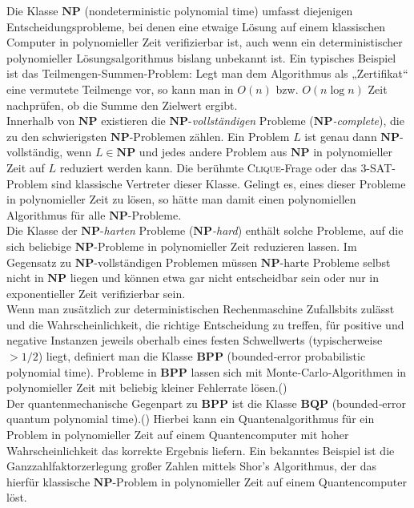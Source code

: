 {Die Klasse \(\mathbf{NP}\) (nondeterministic polynomial time) umfasst diejenigen Entscheidungsprobleme, bei denen eine etwaige Lösung auf einem klassischen Computer in polynomieller Zeit verifizierbar ist, auch wenn ein deterministischer polynomieller Lösungsalgorithmus bislang unbekannt ist. Ein typisches Beispiel ist das Teilmengen-Summen-Problem: Legt man dem Algorithmus als „Zertifikat“ eine vermutete Teilmenge vor, so kann man in \(O(n)\) bzw. \(O(n\log n)\) Zeit nachprüfen, ob die Summe den Zielwert ergibt.\\

Innerhalb von \(\mathbf{NP}\) existieren die \(\mathbf{NP}\)-\emph{vollständigen} Probleme (\(\mathbf{NP}\)\emph{-complete}), die zu den schwierigsten \(\mathbf{NP}\)-Problemen zählen. Ein Problem \(L\) ist genau dann \(\mathbf{NP}\)-vollständig, wenn \(L\in\mathbf{NP}\) und jedes andere Problem aus \(\mathbf{NP}\) in polynomieller Zeit auf \(L\) reduziert werden kann. Die berühmte \textsc{Clique}-Frage oder das \textsc{3-SAT}-Problem sind klassische Vertreter dieser Klasse. Gelingt es, eines dieser Probleme in polynomieller Zeit zu lösen, so hätte man damit einen polynomiellen Algorithmus für alle \(\mathbf{NP}\)-Probleme.\\

Die Klasse der \(\mathbf{NP}\)-\emph{harten} Probleme (\(\mathbf{NP}\)\emph{-hard}) enthält solche Probleme, auf die sich beliebige \(\mathbf{NP}\)-Probleme in polynomieller Zeit reduzieren lassen. Im Gegensatz zu \(\mathbf{NP}\)-vollständigen Problemen müssen \(\mathbf{NP}\)-harte Probleme selbst nicht in \(\mathbf{NP}\) liegen und können etwa gar nicht entscheidbar sein oder nur in exponentieller Zeit verifizierbar sein.\\

Wenn man zusätzlich zur deterministischen Rechenmaschine Zufallsbits zulässt und die Wahrscheinlichkeit, die richtige Entscheidung zu treffen, für positive und negative Instanzen jeweils oberhalb eines festen Schwellwerts (typischerweise \(>1/2\)) liegt, definiert man die Klasse \(\mathbf{BPP}\) (bounded‑error probabilistic polynomial time). Probleme in \(\mathbf{BPP}\) lassen sich mit Monte‑Carlo‑Algorithmen in polynomieller Zeit mit beliebig kleiner Fehlerrate lösen.(\cite{zotero-1212}) \\

Der quantenmechanische Gegenpart zu \(\mathbf{BPP}\) ist die Klasse \(\mathbf{BQP}\) (bounded‑error quantum polynomial time).(\cite{zotero-1212}) Hierbei kann ein Quantenalgorithmus für ein Problem in polynomieller Zeit auf einem Quantencomputer mit hoher Wahrscheinlichkeit das korrekte Ergebnis liefern. Ein bekanntes Beispiel ist die Ganzzahlfaktorzerlegung großer Zahlen mittels Shor’s Algorithmus, der das hierfür klassische \(\mathbf{NP}\)-Problem in polynomieller Zeit auf einem Quantencomputer löst.

}
